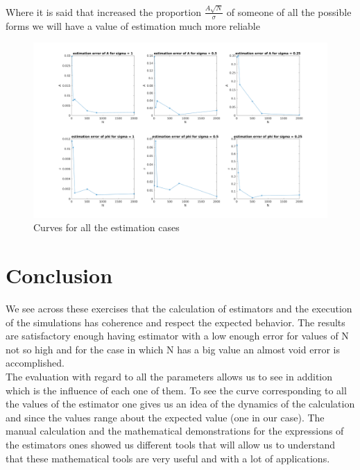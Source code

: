 \documentclass{report}
\begin{document}
Where it is said that increased the proportion $\frac{A\sqrt{N}}{\sigma}$ of someone of all the possible forms we will have a value of estimation much more reliable
\begin{figure}[h]
	\centering
	\includegraphics[width=\linewidth]{../2000_2}
	\caption{Curves for all the estimation cases}
	\label{fig:10002}
\end{figure}




\newpage
\section{Conclusion}

We see across these exercises that the calculation of estimators and the execution of the simulations has coherence and respect the expected behavior. The results are satisfactory enough having estimator with a low enough error for values of N not so high and for the case in which N has a big value an almost void error is accomplished.\\
The evaluation with regard to all the parameters allows us to see in addition which is the influence of each one of them.
To see the curve corresponding to all the values of the estimator one gives us an idea of the dynamics of the calculation and since the values range about the expected value (one in our case).
The manual calculation and the mathematical demonstrations  for the expressions of the estimators ones showed us different tools that will allow us to understand that these mathematical tools are very useful and with a lot of applications.



\end{document}
